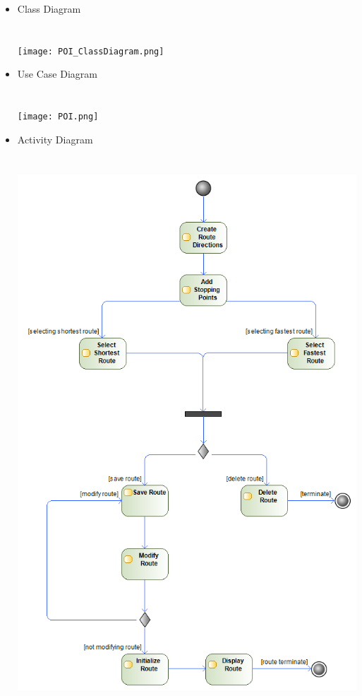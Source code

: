 \documentclass{article}
\begin{document}
			\begin{itemize}
 				\item Class Diagram
 				\\
 				\\
 				\\ 			
				\texttt{[image: POI\_ClassDiagram.png]}
			\pagebreak
			
				\item Use Case Diagram
 				\\
 				\\
 				\\ 			
				\texttt{[image: POI.png]}
			\pagebreak
			
				\item Activity Diagram
 				\\
 				\\
 				\\ 			
				\includegraphics[scale=0.45]{navigationActivityDiagram.png}
				
				
			\end{itemize}
\end{document}
